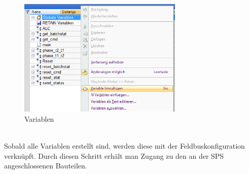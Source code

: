 \begin{figure}[h!]
  \centering
  \includegraphics[width=0.7\textwidth]{graphics/implementation/Variablen}
  \caption{Variablen}%
\end{figure}\\
Sobald alle Variablen erstellt sind, werden diese mit der Feldbuskonfiguration verknüpft. Durch diesen Schritt erhält man Zugang zu den an der SPS angeschlossenen Bauteilen.\\
\\

